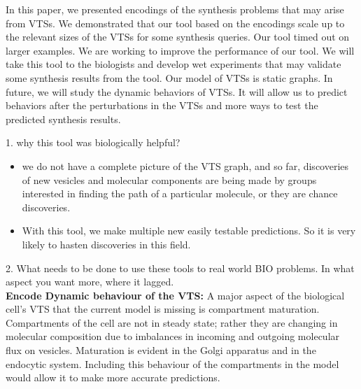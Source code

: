 In this paper, we presented encodings of the synthesis problems
that may arise from VTSs.
%
We demonstrated that our tool based on the encodings
scale up to the relevant sizes of the VTSs for some synthesis queries.
%
Our tool timed out on larger examples.
%
We are working to improve the performance of our tool.
%
We will take this tool to the biologists and develop wet experiments that may validate some synthesis results from the tool.
%
Our model of VTSs is static graphs.
%
In future, we will study the dynamic behaviors of VTSs.
%
It will allow us to predict behaviors after the perturbations in the VTSs
and more ways to test the predicted synthesis results.

1. why this tool was biologically helpful?
\begin{itemize}
	\item we do not have a complete picture of the VTS graph, and so far, discoveries of new vesicles and molecular components are being made by groups interested in finding the path of a particular molecule, or they are chance discoveries. 
	\item With this tool, we make multiple new easily testable predictions. So it is very likely to hasten discoveries in this field.
\end{itemize}

2.  What  needs  to  be  done  to  use  these  tools  to  real  world  BIO problems. In what aspect you want more, where it lagged.
\\
\textbf{Encode Dynamic behaviour of the VTS:} A major aspect of the biological cell’s VTS that the current model is missing is compartment maturation. Compartments of the cell are not in steady state; rather they are changing in molecular composition due to imbalances in incoming and outgoing molecular flux on vesicles.
Maturation  is  evident  in  the  Golgi  apparatus  and  in  the  endocytic system. 
Including this behaviour of the compartments in the model would allow it to make more accurate predictions.
